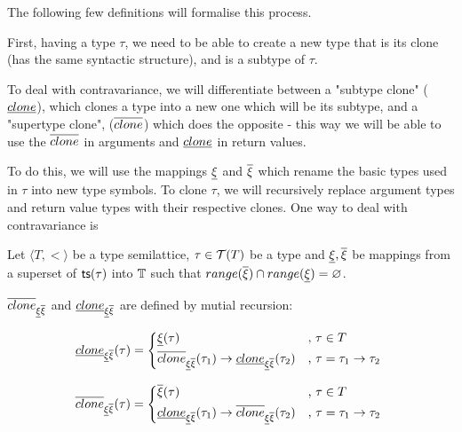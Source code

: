 \documentclass[main.tex]{subfiles}
\begin{document}
The following few definitions will formalise this process.

First, having a type $\tau$, we need to be able to create a new type
that is its clone
(has the same syntactic structure), and is a subtype of $\tau$.

To deal with contravariance, we will differentiate between a "subtype clone"
($\underline{clone}$),
which clones a type into a new one which will be its subtype, and a
"supertype clone", ($\overline{clone}$)
which does the opposite - this way we will be able to
use the $\overline{clone}$ in arguments and $\underline{clone}$ in return
values.

To do this, we will use the mappings $\underline{\xi}$ and $\overline{\xi}$
which rename the basic types used in $\tau$ into new type symbols. To clone
$\tau$, we will recursively replace argument types and return value types
with their respective clones. One way to deal with contravariance is

\newcommand\clonesub{\subtyper{clone}_{\subtyper{\xi} \suptyper{\xi}}}
\newcommand\clonesup{\suptyper{clone}_{\subtyper{\xi} \suptyper{\xi}}}

\begin{defn}
    Let $\langle T, \less \rangle$ be a type semilattice, $\tau \in \mathcal{T}( T )$
    be a type and $\underline{\xi}, \overline{\xi}$ be mappings from a
    superset of
    $\mathsf{ts}(\tau)$ into $\mathbb{T}$ such that
    $range(\overline{\xi}) \cap range(\underline{\xi}) = \varnothing$.

    $\overline{clone}_{\underline{\xi} \overline{\xi}}$ and
    $\underline{clone}_{\underline{\xi} \overline{\xi}}$ are defined by
    mutial recursion:

    \[
        \subtyper{clone}_{\subtyper{\xi} \suptyper{\xi}}(\tau) =
        \begin{cases*}
            \subtyper{\xi}(\tau)& ,
                $\tau \in T$ \\
            \suptyper{clone}_{\subtyper{\xi} \suptyper{\xi}}(\tau_1)
                \tot \subtyper{clone}_{\subtyper{\xi} \suptyper{\xi}}(\tau_2)& ,
                $\tau = \tau_1 \tot \tau_2$ \\
        \end{cases*}
    \]

    \[
        \suptyper{clone}_{\subtyper{\xi} \suptyper{\xi}}(\tau) =
        \begin{cases*}
            \suptyper{\xi}(\tau)& ,
                $\tau \in T$ \\
            \subtyper{clone}_{\subtyper{\xi} \suptyper{\xi}}(\tau_1)
                \tot \suptyper{clone}_{\subtyper{\xi} \suptyper{\xi}}(\tau_2)& ,
                $\tau = \tau_1 \tot \tau_2$ \\
        \end{cases*}
    \]

\end{defn}
\end{document}
